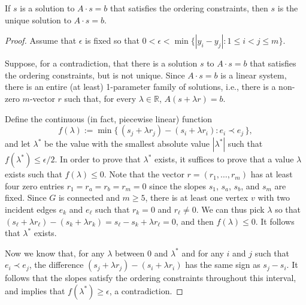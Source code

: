 \begin{lem}
	If $s$ is a solution to $A\cdot s=b$ that satisfies the ordering
	constraints, %
	then $s$ is 
	the unique solution to $A\cdot s=b$.
\end{lem}

\begin{proof}
	Assume that $\epsilon$ is fixed so that $0<\epsilon<\min\{|y_i-y_j| : 1\le i< j\le m\}$.
	
	Suppose, for a contradiction, that there is a solution $s$ to $A\cdot s=b$ that satisfies the ordering
	constraints, %
	but is not unique.  Since $A\cdot s=b$ is a linear system, there is an entire (at least) 1-parameter family of solutions,
	i.e., there is a non-zero $m$-vector $r$ such that, for every
	$\lambda\in\mathbb R$, $A(s+\lambda r)=b$.
	
	
	Define the continuous (in fact, piecewise linear) function
	\begin{equation*}
	f(\lambda) := \min \{\, (s_j+\lambda r_j)-(s_i+\lambda r_i) : e_i \prec
	e_j\,\}
	,
	\end{equation*}
	and let $\lambda^*$ be the value with the smallest absolute value
	$|\lambda^*|$ such that
	$f(\lambda^*)\le\epsilon/2$. In order to prove that $\lambda^*$ exists, it suffices to prove that a value $\lambda$ exists such that $f(\lambda)\le 0$. Note that the vector $r=(r_1,\ldots,r_m)$ has at least four zero entries
	$r_1=r_a=r_b=r_m=0$ since the slopes $s_1$, $s_a$, $s_b$, and $s_m$
	are fixed.
	Since $G$ is connected and $m\geq 5$, there is at least one vertex $v$ with two incident edges $e_k$
	and $e_\ell$ such that $r_k=0$ and $r_\ell\neq 0$. 
	We can thus pick $\lambda$ so that $(s_\ell+\lambda r_\ell)-(s_k+\lambda r_k)=s_\ell-s_k+\lambda r_\ell=0$,
	and then $f(\lambda)\le 0$. It follows that $\lambda^*$ exists.
	
	Now we know that, for any $\lambda$ between $0$ and $\lambda^*$ and for any $i$ and $j$ such that $e_i\prec e_j$, the difference $(s_j+\lambda r_j)-(s_i+\lambda r_i)$ has the same sign as $s_j-s_i$. It follows that the slopes satisfy the ordering constraints throughout
	this interval, and
	 implies that $f(\lambda^*)\ge\epsilon$, a contradiction.
\end{proof}


